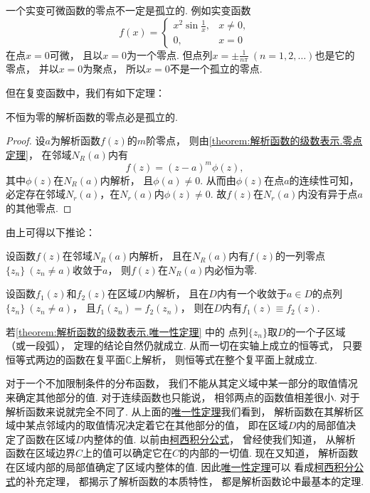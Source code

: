 一个实变可微函数的零点不一定是孤立的.
例如实变函数\begin{equation*}
	f(x) = \left\{ \begin{array}{cl}
		x^2 \sin\frac1x, & x\neq0, \\
		0, & x=0
	\end{array} \right.
\end{equation*}在点\(x=0\)可微，
且以\(x=0\)为一个零点.
但点列\(x = \pm\frac1{n\pi}\ (n=1,2,\dotsc)\)也是它的零点，
并以\(x = 0\)为聚点，
所以\(x = 0\)不是一个孤立的零点.

但在复变函数中，我们有如下定理：
\begin{theorem}\label{theorem:解析函数的级数表示.解析函数的零点的孤立性}
不恒为零的解析函数的零点必是孤立的.
\begin{proof}
设\(a\)为解析函数\(f(z)\)的\(m\)阶零点，
则由\cref{theorem:解析函数的级数表示.零点定理}，
在邻域\(N_R(a)\)内有\begin{equation*}
	f(z) = (z-a)^m \phi(z),
\end{equation*}
其中\(\phi(z)\)在\(N_R(a)\)内解析，
且\(\phi(a)\neq0\).
从而由\(\phi(z)\)在点\(a\)的连续性可知，
必定存在邻域\(N_r(a)\)，在\(N_r(a)\)内\(\phi(z)\neq0\).
故\(f(z)\)在\(N_r(a)\)内没有异于点\(a\)的其他零点.
\end{proof}
\end{theorem}

由上可得以下推论：
\begin{corollary}
设函数\(f(z)\)在邻域\(N_R(a)\)内解析，
且在\(N_R(a)\)内有\(f(z)\)的一列零点\(\{z_n\}\ (z_n \neq a)\)收敛于\(a\)，
则\(f(z)\)在\(N_R(a)\)内必恒为零.
\end{corollary}

\begin{theorem}[唯一性定理]\label{theorem:解析函数的级数表示.唯一性定理}
设函数\(f_1(z)\)和\(f_2(z)\)在区域\(D\)内解析，
且在\(D\)内有一个收敛于\(a \in D\)的点列\(\{z_n\}\ (z_n \neq a)\)，
且\(f_1(z_n) = f_2(z_n)\)，
则在\(D\)内有\(f_1(z) \equiv f_2(z)\).
\end{theorem}

若\cref{theorem:解析函数的级数表示.唯一性定理} 中的
点列\(\{z_n\}\)取\(D\)的一个子区域（或一段弧），
定理的结论自然仍就成立.
从而一切在实轴上成立的恒等式，
只要恒等式两边的函数在复平面\(\mathbb{C}\)上解析，
则恒等式在整个复平面上就成立.

对于一个不加限制条件的分布函数，
我们不能从其定义域中某一部分的取值情况来确定其他部分的值.
对于连续函数也只能说，
相邻两点的函数值相差很小.
对于解析函数来说就完全不同了.
从上面的\hyperref[theorem:解析函数的级数表示.唯一性定理]{唯一性定理}我们看到，
解析函数在其解析区域中某点邻域内的取值情况决定着它在其他部分的值，
即在区域\(D\)内的局部值决定了函数在区域\(D\)内整体的值.
以前由\hyperref[equation:解析函数的积分表示.柯西积分公式]{柯西积分公式}，
曾经使我们知道，
从解析函数在区域边界\(C\)上的值可以确定它在\(C\)的内部的一切值.
现在又知道，
解析函数在区域内部的局部值确定了区域内整体的值.
因此\hyperref[theorem:解析函数的级数表示.唯一性定理]{唯一性定理}可以
看成\hyperref[equation:解析函数的积分表示.柯西积分公式]{柯西积分公式}的补充定理，
都揭示了解析函数的本质特性，
都是解析函数论中最基本的定理.
